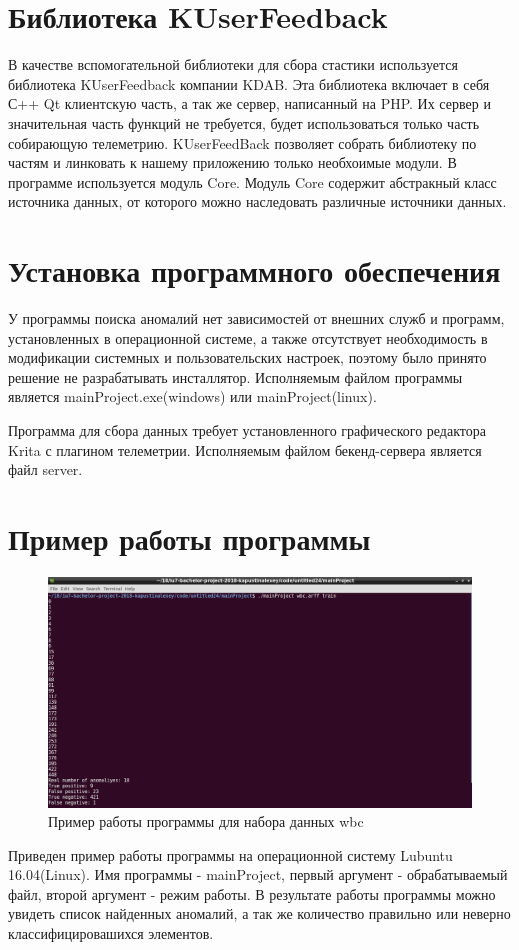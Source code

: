 \section{Библиотека KUserFeedback}

В качестве вспомогательной библиотеки для сбора стастики используется библиотека KUserFeedback компании KDAB. Эта библиотека включает в себя С++ Qt клиентскую часть, а так же сервер, написанный на PHP. Их сервер  и значительная часть функций не требуется, будет использоваться только часть собирающую телеметрию. KUserFeedBack позволяет  собрать библиотеку по частям и линковать к нашему приложению только необхоимые модули. В программе используется модуль Core. Модуль Core содержит абстракный класс источника данных, от которого можно наследовать различные источники данных.

\section{Установка программного обеспечения}

У программы поиска аномалий нет зависимостей от внешних служб и программ, установленных в операционной системе, а также отсутствует
необходимость в модификации системных и пользовательских настроек, поэтому было принято решение не разрабатывать инсталлятор.
Исполняемым файлом программы является mainProject.exe(windows) или mainProject(linux).

Программа для сбора данных требует установленного графического редактора Krita с плагином  телеметрии.
Исполняемым файлом бекенд-сервера является файл server.
\section{Пример работы программы}
\begin{figure}[!h]
	\centering
	\includegraphics[width=.8\textwidth]{img/screenPr.png}
	\caption{Пример работы программы для набора данных wbc}
	\label{fig10}
\end{figure}
Приведен пример работы программы на операционной систему Lubuntu 16.04(Linux). Имя программы - mainProject, первый аргумент - обрабатываемый файл, второй аргумент - режим работы. В результате работы программы можно увидеть список найденных аномалий, а так же количество правильно или неверно классифицировашихся элементов.
